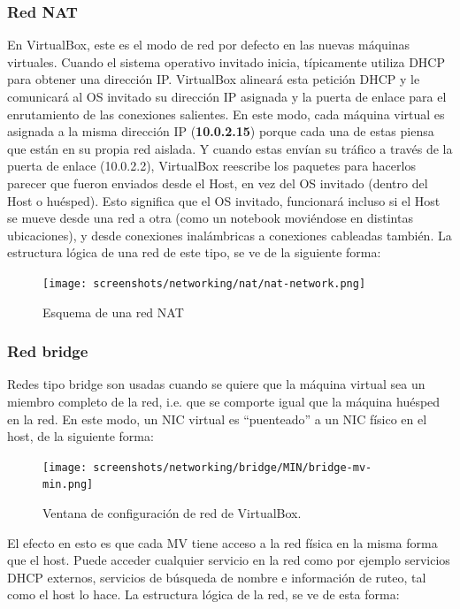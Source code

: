 \documentclass[11pt]{article}
\begin{document}
\subsubsection{Red NAT}
En VirtualBox, este es el modo de red por defecto en las nuevas máquinas virtuales. Cuando el sistema operativo invitado inicia, típicamente utiliza DHCP para obtener una dirección IP. VirtualBox alineará esta petición DHCP y le comunicará al OS invitado su dirección IP asignada y la puerta de enlace para el enrutamiento de las conexiones salientes. En este modo, cada máquina virtual es asignada a la misma dirección IP (\textbf{10.0.2.15}) porque cada una de estas piensa que están en su propia red aislada. Y cuando estas envían su tráfico a través de la puerta de enlace (10.0.2.2), VirtualBox reescribe los paquetes para hacerlos parecer que fueron enviados desde el Host, en vez del OS invitado (dentro del Host o huésped).
Esto significa que el OS invitado, funcionará incluso si el Host se mueve desde una red a otra (como un notebook moviéndose en distintas ubicaciones), y desde conexiones inalámbricas a conexiones cableadas también. La estructura lógica de una red de este tipo, se ve de la siguiente forma:


	\begin{figure}[ht]
	\center
	\texttt{[image: screenshots/networking/nat/nat-network.png]} 
	\caption{Esquema de una red NAT}
	\end{figure}

\subsubsection{Red bridge}
	Redes tipo bridge son usadas cuando se quiere que la máquina virtual sea un miembro completo de la red, i.e. que se comporte igual que la máquina huésped en la red. En este modo, un NIC virtual es ``puenteado'' a un NIC físico en el host, de la siguiente forma:

	\clearpage

	\begin{figure}[ht]
	\center
	\texttt{[image: screenshots/networking/bridge/MIN/bridge-mv-min.png]}
	\caption{Ventana de configuración de red de VirtualBox.}
	\end{figure}

	El efecto en esto es que cada MV tiene acceso a la red física en la misma forma que el host. Puede acceder cualquier servicio en la red como por ejemplo servicios DHCP externos, servicios de búsqueda de nombre e información de ruteo, tal como el host lo hace. La estructura lógica de la red, se ve de esta forma:
\end{document}
